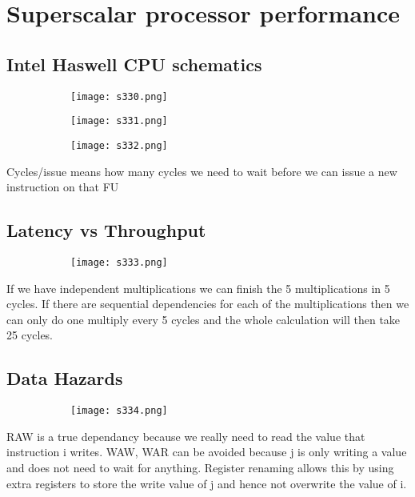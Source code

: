 \documentclass[8pt]{extreport}
\begin{document}
\section{Superscalar processor performance}

\subsection{Intel Haswell CPU schematics}
\begin{figure}[H]
\begin{subfigure}[b]{0.4\linewidth}
\texttt{[image: s330.png]}
\end{subfigure}
\begin{subfigure}[b]{0.4\linewidth}
\texttt{[image: s331.png]}
\end{subfigure}
\begin{subfigure}[b]{0.4\linewidth}
\texttt{[image: s332.png]}
\end{subfigure}
\end{figure}
Cycles/issue means how many cycles we need to wait before we can issue a new instruction on that FU

\subsection{Latency vs Throughput}
\begin{figure}[H]
\begin{subfigure}[b]{0.4\linewidth}
\texttt{[image: s333.png]}
\end{subfigure}
\end{figure}
If we have independent multiplications we can finish the 5 multiplications in 5 cycles. If there are sequential dependencies for each of the multiplications then we can only do one multiply every 5 cycles and the whole calculation will then take 25 cycles.

\subsection{Data Hazards}
\begin{figure}[H]
\begin{subfigure}[b]{0.4\linewidth}
\texttt{[image: s334.png]}
\end{subfigure}
\end{figure}
RAW is a true dependancy because we really need to read the value that instruction i writes. WAW, WAR can be avoided because j is only writing a value and does not need to wait for anything. Register renaming allows this by using extra registers to store the write value of j and hence not overwrite the value of i.
\end{document}
